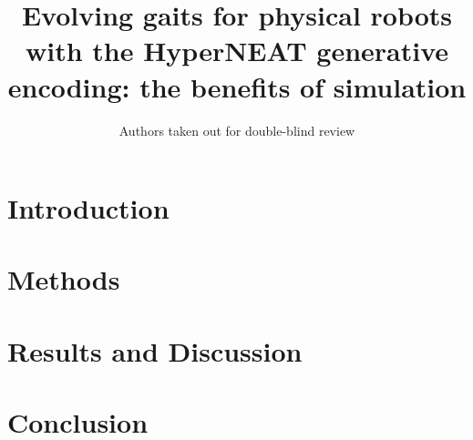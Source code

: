 \documentclass{llncs}
\begin{document}
%
\title{Evolving gaits for physical robots with the HyperNEAT generative encoding: the benefits of simulation}

\author{Authors taken out for double-blind review}
\maketitle
%
%
%
%
\begin{abstract}

\end{abstract}
%
%


\section{Introduction}

%
%
\section{Methods}








%
%
\section{Results and Discussion}

%
%
\section{Conclusion}

%
%

%
\footnotesize


%
%
\end{document}
